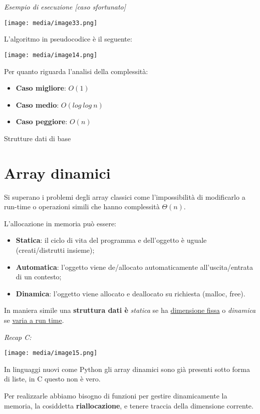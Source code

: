 \emph{Esempio di esecuzione {[}caso sfortunato{]}}

\texttt{[image: media/image33.png]}

L'algoritmo in pseudocodice è il seguente:

\texttt{[image: media/image14.png]}

Per quanto riguarda l'analisi della complessità:

\begin{itemize}
\item
  \textbf{Caso migliore}: \(O(1)\)
\item
  \textbf{Caso medio}: \(O(log\ log\ n)\)
\item
  \textbf{Caso peggiore}: \(O(n)\)
\end{itemize}

Strutture dati di base

\section{Array dinamici}\label{array-dinamici}

Si superano i problemi degli array classici come l'impossibilità di
modificarlo a run-time o operazioni simili che hanno complessità
\(\Theta(n)\).

L'allocazione in memoria può essere:

\begin{itemize}
\item
  \textbf{Statica}: il ciclo di vita del programma e dell'oggetto è
  uguale (creati/distrutti insieme);
\item
  \textbf{Automatica}: l'oggetto viene de/allocato automaticamente
  all'uscita/entrata di un contesto;
\item
  \textbf{Dinamica}: l'oggetto viene allocato e deallocato su richiesta
  (malloc, free).
\end{itemize}

In maniera simile una \textbf{struttura dati è} \emph{statica} se ha
\ul{dimensione fissa} o \emph{dinamica} se \ul{varia a run time}.

\emph{Recap C:}

\texttt{[image: media/image15.png]}

In linguaggi nuovi come Python gli array dinamici sono già presenti
sotto forma di liste, in C questo non è vero.

Per realizzarle abbiamo bisogno di funzioni per gestire dinamicamente la
memoria, la cosiddetta \textbf{riallocazione}, e tenere traccia della
dimensione corrente.


